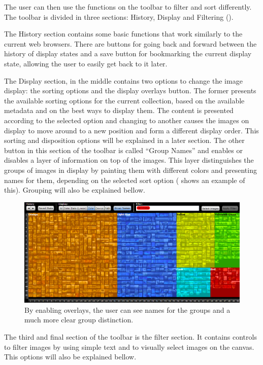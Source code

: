The user can then use the functions on the toolbar to filter and sort differently. The toolbar is divided in three sections: History, Display and Filtering ().

The History section contains some basic functions that work similarly to the current web browsers. There are buttons for going back and forward between the history of display states and a save button for bookmarking the current display state, allowing the user to easily get back to it later.

The Display section, in the middle contains two options to change the image display: the sorting options and the display overlays button. The former presents the available sorting options for the current collection, based on the available metadata and on the best ways to display them. The content is presented according to the selected option and changing to another causes the images on display to move around to a new position and form a different display order. This sorting and disposition options will be explained in a later section.
The other button in this section of the toolbar is called ``Group Names'' and enables or disables a layer of information on top of the images. This layer distinguishes the groups of images in display by painting them with different colors and presenting names for them, depending on the selected sort option ( shows an example of this). Grouping will also be explained bellow. 

\begin{figure}[htbp]
	\centering
		\includegraphics[width=\linewidth]{Figures/overlays.png}
	\caption[Overlays in Eagle Eye]{By enabling overlays, the user can see names for the groups and a much more clear group distinction.}
	\label{fig:overlays}
\end{figure}

The third and final section of the toolbar is the filter section. It contains controls to filter images by using simple text and to visually select images on the canvas. This options will also be explained bellow.



